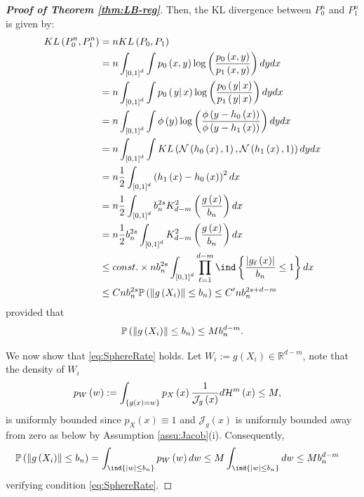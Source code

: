 \documentclass[12pt,american]{article}
\theoremstyle{definition}
\theoremstyle{plain}
\theoremstyle{definition}
\theoremstyle{plain}
\theoremstyle{plain}
\theoremstyle{plain}
\theoremstyle{plain}
\theoremstyle{plain}
\newcommand{\R}{\mathbb{R}}
\newcommand{\norm}[1]{\left\| #1 \right\|}
\begin{document}
\begin{proof}[\textbf{Proof of Theorem \ref{thm:LB-reg}}]
Then, the KL divergence between $P_{0}^{n}$ and $P_{1}^{n}$ is given
by:
\begin{align}
KL\left(P_{0}^{n},P_{1}^{n}\right) & =nKL\left(P_{0},P_{1}\right)\nonumber \\
 & =n\int_{\left[0,1\right]^{d}}\int p_{0}\left(x,y\right)\log\left(\frac{p_{0}\left(x,y\right)}{p_{1}\left(x,y\right)}\right)dydx\nonumber \\
 & =n\int_{\left[0,1\right]^{d}}\int p_{0}\left(\rest yx\right)\log\left(\frac{p_{0}\left(\rest yx\right)}{p_{1}\left(\rest yx\right)}\right)dydx\nonumber \\
 & =n\int_{\left[0,1\right]^{d}}\int\phi\left(y\right)\log\left(\frac{\phi\left(y-h_{0}\left(x\right)\right)}{\phi\left(y-h_{1}\left(x\right)\right)}\right)dydx\nonumber \\
 & =n\int_{\left[0,1\right]^{d}}\int KL\left(\cN\left(h_{0}\left(x\right),1\right),{\cal N}\left(h_{1}\left(x\right),1\right)\right)dydx\nonumber \\
 & =n\frac{1}{2}\int_{\left[0,1\right]^{d}}\left(h_{1}\left(x\right)-h_{0}\left(x\right)\right)^{2}dx\nonumber \\
 & =n\frac{1}{2}\int_{\left[0,1\right]^{d}}b_{n}^{2s}K_{d-m}^{2}\left(\frac{g\left(x\right)}{b_{n}}\right)dx\nonumber \\
 & =n\frac{1}{2}b_{n}^{2s}\int_{\left[0,1\right]^{d}}K_{d-m}^{2}\left(\frac{g\left(x\right)}{b_{n}}\right)dx\nonumber \\
 & \leq const.\times n b_{n}^{2s}\int_{\left[0,1\right]^{d}}\prod_{\ell=1}^{d-m}\ind\left\{ \frac{\left|g_{\ell}\left(x\right)\right|}{b_{n}}\leq1\right\} dx\nonumber \\
 & \leq Cnb_{n}^{2s}\P\left(\norm{g\left(X_{i}\right)}\leq b_{n}\right) \leq C'nb_{n}^{2s+d-m}\label{eq:KL_rate}
\end{align}
provided that
\begin{equation}
\P\left(\norm{g\left(X_{i}\right)}\leq b_{n}\right)
\leq Mb_{n}^{d-m}.\label{eq:SphereRate}
\end{equation}

We now show that \eqref{eq:SphereRate} holds. Let $W_{i}:=g\left(X_{i}\right) \in \R^{d-m}$,
note that the density of $W_{i}$
\begin{align*}
p_{W}\left(w\right) & :=\int_{\left\{ g\left(x\right)=w\right\} }p_{X}\left(x\right)\frac{1}{\mathcal{J}_g\left(x\right)}d{\cal H}^{m}\left(x\right)\leq M,
\end{align*}
is uniformly bounded since $p_{X}\left(x\right)\equiv1$ and $\mathcal{J}_g\left(x\right)$
is uniformly bounded away from zero as below by Assumption \ref{assu:Jacob}(i).
Consequently,
\begin{align*}
\P\left(\norm{g\left(X_{i}\right)}\leq b_{n}\right) & =\int_{\ind\left\{ \left|w\right|\leq b_{n}\right\} }p_{W}\left(w\right)dw \leq M\int_{\ind\left\{ \left|w\right|\leq b_{n}\right\} }dw \leq Mb_{n}^{d-m}
\end{align*}
verifying condition \eqref{eq:SphereRate}.


\end{proof}
\end{document}
